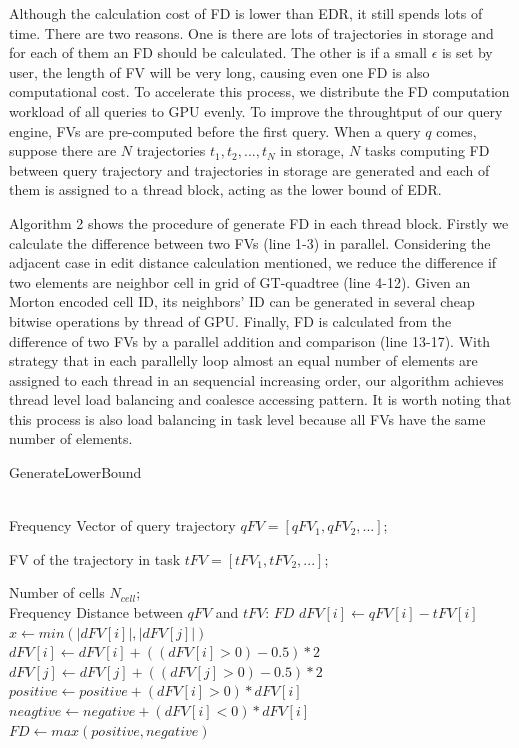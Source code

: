 \documentclass[conference]{IEEEtran}
\begin{document}
Although the calculation cost of FD is lower than EDR, it still spends lots of time. There are two reasons. One is there are lots of trajectories in storage and for each of them an FD should be calculated. The other is if a small $\epsilon$ is set by user, the length of FV will be very long, causing even one FD is also computational cost. To accelerate this process, we distribute the FD computation workload of all queries to GPU evenly. To improve the throughtput of our query engine, FVs are pre-computed before the first query. When a query $q$ comes, suppose there are $N$ trajectories $t_{1},t_{2},...,t_{N}$ in storage, $N$ tasks computing FD between query trajectory and trajectories in storage are generated and each of them is assigned to a thread block, acting as the lower bound of EDR. 

Algorithm 2 shows the procedure of generate FD in each thread block. Firstly we calculate the difference between two FVs (line 1-3) in parallel. Considering the adjacent case in edit distance calculation mentioned, we reduce the difference if two elements are neighbor cell in grid of GT-quadtree (line 4-12). Given an Morton encoded cell ID, its neighbors' ID can be generated in several cheap bitwise operations by thread of GPU. Finally, FD is calculated from the difference of two FVs by a parallel addition and comparison (line 13-17). With strategy that in each parallelly loop almost an equal number of elements are assigned to each thread in an sequencial increasing order, our algorithm achieves thread level load balancing and coalesce accessing pattern. It is worth noting that this process is also load balancing in task level because all FVs have the same number of elements.

\begin{algorithm}[htb]
	\caption{GenerateLowerBound}
	\label{alg:GetLB}
	\begin{algorithmic}[1]
		\REQUIRE ~~\\
		Frequency Vector of query trajectory $qFV=[qFV_{1},qFV_{2},...]$;
		
		FV of the trajectory in task $tFV=[tFV_{1},tFV_{2},...]$;
		
		Number of cells $N_{cell}$;
		\ENSURE ~~\\
		Frequency Distance between $qFV$ and $tFV$: $FD$
		\STATE $dFV[i] \leftarrow qFV[i]-tFV[i]$
		\ENDFOR
		\STATE $x \leftarrow min(|dFV[i]|,|dFV[j]|)$
		\STATE $dFV[i] \leftarrow dFV[i] + ((dFV[i]>0)-0.5)*2$
		\STATE $dFV[j] \leftarrow dFV[j] + ((dFV[j]>0)-0.5)*2$
		\ENDIF
		\ENDFOR
		\ENDFOR
		\STATE $positive \leftarrow positive+(dFV[i]>0)*dFV[i]$
		\STATE $neagtive \leftarrow negative+(dFV[i]<0)*dFV[i]$
		\ENDFOR
		\STATE $FD \leftarrow max(positive,negative)$
	\end{algorithmic}
\end{algorithm}
\end{document}
